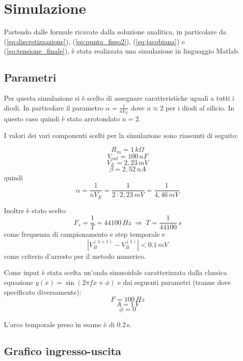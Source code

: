 \chapter{Simulazione}
	Partendo dalle formule ricavate dalla soluzione analitica, in particolare da (\ref{eq:discretizzazione}), (\ref{eq:punto_fisso2}), (\ref{eq:jacobiana}) e (\ref{eq:tensione_finale}), è stata realizzata una simulazione in linguaggio Matlab.
	
	\section{Parametri}
		Per questa simulazione si è scelto di assegnare caratteristiche uguali a tutti i diodi. In particolare il parametro $\alpha = \frac{1}{nV_{E}}$ dove $n \approx 2$ per i diodi al silicio. In questo caso quindi è stato arrotondato $n = 2$.
	
		I valori dei vari componenti scelti per la simulazione sono riassunti di seguito:
	
		\[
			R_{in} = 1\,k\Omega
		\]
		\[
			V_{out} = 100\,nF
		\]
		\[
			V_{E} = 2,23\,mV
		\]
		\[
			\beta = 2,52\,nA
		\]
		quindi
		\[
			\alpha = \frac{1}{nV_{E}} = \frac{1}{2 \cdot 2,23\,mV} = \frac{1}{4,46\,mV}
		\]
	
		Inoltre è stato scelto
		\[
			F_{s} = \frac{1}{T} = 44100\,Hz \; \Rightarrow \; T = \frac{1}{44100}\,s
		\]
		come frequenza di campionamento e step temporale e
		\[
			|V_{B}^{(\lambda+1)} - V_{B}^{(\lambda)}| < 0.1\,mV
		\]
		come criterio d'arresto per il metodo numerico.
	
		Come input è stata scelta un'onda sinusoidale caratterizzata dalla classica equazione $y(x) = \sin (2 \pi f x + \phi)$ e dai seguenti parametri (tranne dove specificato diversamente):
		\[
			F = 100\,Hz
		\]
		\[
			A = 1\,V
		\]
		\[
			\phi = 0
		\]
		
		\vspace{10px}
		L'arco temporale preso in esame è di 0.2\,s.
	\pagebreak
	
	\section{Grafico ingresso-uscita}
		